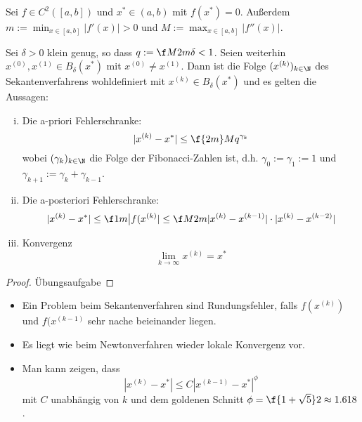 \documentclass[11pt]{scrartcl}
\begin{document}
\begin{st} \label{3.6}
	Sei $f\in C^2([a,b])$ und $x^* \in (a,b)$ mit $f(x^*) = 0$.
	Außerdem $m := \min_{x \in [a,b]}|f'(x)| > 0$ und $M := \max_{x\in[a,b]}|f''(x)|$.

	Sei $\delta > 0$ klein genug, so dass $q := \f M{2m} \delta < 1$.
	Seien weiterhin $x^{(0)}, x^{(1)} \in B_\delta(x^*)$ mit $x^{(0)} \neq x^{(1)}$.
	Dann ist die Folge $(x^{(k)})_{k \in \N}$ des Sekantenverfahrens wohldefiniert mit $x^{(k)} \in B_\delta(x^*)$ und es gelten die Aussagen:
	\begin{enumerate}[i)]
		\item
			Die a-priori Fehlerschranke:
			\[
				|x^{(k)} -x^*| \le \f {2m}M q^{\gamma_k}
			\]
			wobei $(\gamma_k)_{k\in \N}$ die Folge der Fibonacci-Zahlen ist, d.h. $\gamma_0 := \gamma_1 := 1$ und $\gamma_{k+1} := \gamma_k + \gamma_{k-1}$.
		\item
			Die a-posteriori Fehlerschranke:
			\[
				|x^{(k)}-x^*| \le \f 1m \big| f(x^{(k)} | \le \f M{2m} |x^{(k)} - x^{(k-1)}| \cdot |x^{(k)}-x^{(k-2)}|
			\]
		\item
			Konvergenz
			\[
				\lim_{k \to \infty} x^{(k)} = x^*
			\]
	\end{enumerate}
	\begin{proof}
		Übungsaufgabe
	\end{proof}
	\begin{note}
		\begin{itemize}
			\item
				Ein Problem beim Sekantenverfahren sind Rundungsfehler, falls $f(x^{(k)})$ und $f(x^{(k-1)}$ sehr nache beieinander liegen.
			\item
				Es liegt wie beim Newtonverfahren wieder lokale Konvergenz vor.
			\item
				Man kann zeigen, dass
				\[
					|x^{(k)} - x^*| \le C |x^{(k-1)} - x^*|^\phi
				\]
				mit $C$ unabhängig von $k$ und dem goldenen Schnitt $\phi = \f {1+\sqrt 5}2 \approx 1.618$.
		\end{itemize}
	\end{note}
\end{st}
\end{document}
